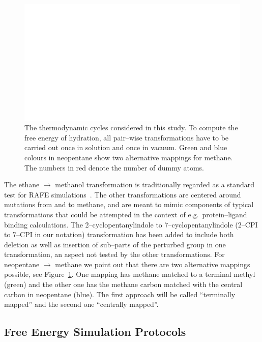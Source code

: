 \documentclass[journal=jctcce,manuscript=article]{achemso}
\begin{document}
\begin{figure}[ht]
  \includegraphics[scale=1.0]{figures/cycles.pdf}
  \caption{The thermodynamic cycles considered in this study.  To
    compute the free energy of hydration, all pair--wise
    transformations have to be carried out once in solution and once
    in vacuum.  Green and blue colours in neopentane show two
    alternative mappings for methane.  The numbers in red denote the
    number of dummy atoms.}
  \label{fig:cycles}
\end{figure}

The ethane $\rightarrow$ methanol transformation is traditionally
regarded as a standard test for RAFE
simulations~\cite{doi:10.1063/1.449208, doi:10.1021/jp981629f}.   The
other transformations are centered around mutations from and to
methane, and are meant to mimic components of typical transformations that could be attempted
in the context of e.g.\ protein--ligand binding calculations. The
2--cyclopentanylindole to 7--cyclopentanylindole (2--CPI to 7--CPI in our notation)
transformation has been added to include both deletion as well as
insertion of sub--parts of the perturbed group in one transformation, an aspect not tested by the other transformations.  For
neopentane $\rightarrow$ methane we point out that there are two
alternative mappings possible, see Figure~\ref{fig:cycles}.  One mapping has methane matched to a terminal methyl (green) and the other
one has the methane carbon matched with the central carbon in
neopentane (blue).  The first approach will be called ``terminally mapped'' and
the second one ``centrally mapped''.


\subsection{Free Energy Simulation Protocols}   %
\label{sec:rafe_protocols}
\end{document}

